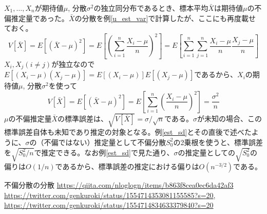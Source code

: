\documentclass[uplatex,dvipdfmx]{jlreq}
\begin{document}
\begin{example}
    $X_1, \dotsc, X_n$が期待値$\mu$, 分散$\sigma^2$の独立同分布であるとき、標本平均$\bar{X}$は期待値$\mu$の不偏推定量であった。$\bar{X}$の分散を例\ref{u_est_var}で計算したが、ここにも再度載せておく。
    \begin{equation}
        V[\bar{X}] = E[(\bar{X} - \mu)^2]
        = E\left[\left(\sum_{i=1}^n\frac{X_i - \mu}{n}\right)^2\right]
        = E\left[\sum_{i=1}^n\sum_{j=1}^n\frac{X_i - \mu}{n}\frac{X_j - \mu}{n}\right]
    \end{equation}
    $X_i, X_j (i \neq j)$が独立なので$E[(X_i-\mu)(X_j-\mu)] = E[(X_i-\mu)]E[(X_j-\mu)]$であるから、$X_i$の期待値$\mu$, 分散$\sigma^2$を使って
    \begin{equation}
        V[\bar{X}] = E[(\bar{X} - \mu)^2]
        = E\left[\sum_{i=1}^n\left(\frac{X_i - \mu}{n}\right)^2\right]
        = \frac{\sigma^2}{n}
    \end{equation}
    $\mu$の不偏推定量$\bar{X}$の標準誤差は、$\sqrt{V[\bar{X}]}=\sigma/\sqrt{n}$である。$\sigma$が未知の場合、この標準誤差自体も未知であり推定の対象となる。例\ref{est_sd}とその直後で述べたように、$\sigma$の（不偏ではない）推定量として不偏分散$S_0^2$の2乗根を使うと、標準誤差を$\sqrt{S_0^2/n}$で推定できる。なお例\ref{est_sd}で見た通り、$\sigma$の推定量としての$\sqrt{S_0^2}$の偏りは$O(1/n)$であるから、標準誤差の推定における偏りは$O(n^{-3/2})$である。
\end{example}

\begin{thebibliography}{9}
     不偏分散の分散 \url{https://qiita.com/nloglogn/items/b863f8cea0ec6da42af3}
     \url{https://twitter.com/genkuroki/status/1554714353081155585?s=20}, \url{https://twitter.com/genkuroki/status/1554714834633379840?s=20}
\end{thebibliography}
\end{document}

